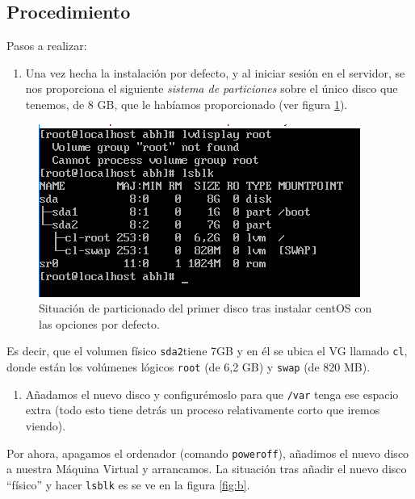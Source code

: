 \documentclass[
]{memoir}
\providecommand{\tightlist}{%
  \setlength{\itemsep}{0pt}\setlength{\parskip}{0pt}}
\begin{document}
\hypertarget{procedimiento}{%
\subsection{Procedimiento}\label{procedimiento}}

Pasos a realizar:

\begin{enumerate}
\def\labelenumi{\arabic{enumi}.}
\tightlist
\item
  Una vez hecha la instalación por defecto, y al iniciar sesión en el servidor, se nos proporciona el siguiente \emph{sistema de particiones} sobre el único disco que tenemos, de 8 GB, que le habíamos proporcionado (ver figura \ref{fig:a}).
\end{enumerate}

\begin{figure}

{\centering \includegraphics[width=0.6\linewidth]{images/a} 

}

\caption{Situación de particionado del primer disco tras instalar centOS con las opciones por defecto.}\label{fig:a}
\end{figure}

Es decir, que el volumen físico \texttt{sda2}tiene 7GB y en él se ubica el VG llamado \texttt{cl}, donde están los volúmenes lógicos \texttt{root} (de 6,2 GB) y \texttt{swap} (de 820 MB).

\begin{enumerate}
\def\labelenumi{\arabic{enumi}.}
\setcounter{enumi}{1}
\tightlist
\item
  Añadamos el nuevo disco y configurémoslo para que \texttt{/var} tenga ese espacio extra (todo esto tiene detrás un proceso relativamente corto que iremos viendo).
\end{enumerate}

Por ahora, apagamos el ordenador (comando \texttt{poweroff}), añadimos el nuevo disco a nuestra Máquina Virtual y arrancamos. La situación tras añadir el nuevo disco ``físico'' y hacer \texttt{lsblk} es se ve en la figura \ref{fig:b}.
\end{document}
